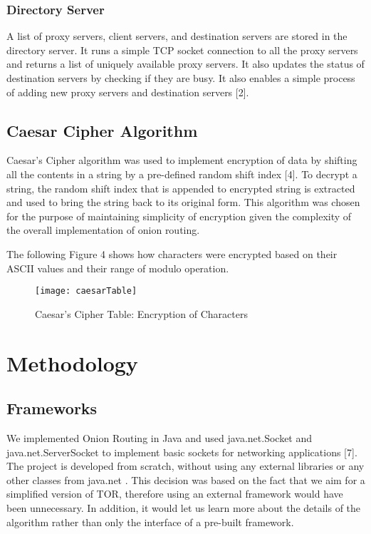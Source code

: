 \documentclass{article}
\begin{document}
\vspace{0.3 cm}

\subsubsection{Directory Server}
A list of proxy servers, client servers, and destination servers are stored in the directory server. It runs a simple TCP socket connection to all the proxy servers and returns a list of uniquely available proxy servers. It also updates the status of  destination servers by checking if they are busy. It also enables a simple process of adding new proxy servers and destination servers [2].

\vspace{0.3 cm}

\subsection{Caesar Cipher Algorithm}
Caesar's Cipher algorithm was used to implement encryption of data by shifting all the contents in a string by a pre-defined random shift index [4]. To decrypt a string, the random shift index that is appended to encrypted string is extracted and used to bring the string back to its original form. This algorithm was chosen for the purpose of maintaining simplicity of encryption given the complexity of the overall implementation of onion routing. \\

\vspace{0.3 cm}

The following Figure 4 shows how characters were encrypted based on their ASCII values and their range of modulo operation. \\

\begin{figure}[!ht]
	\label{fig:iv}
    \centering
    \texttt{[image: caesarTable]}
    \caption{Caesar's Cipher Table: Encryption of Characters}
\end{figure}

\section{Methodology}
\subsection{Frameworks}
We implemented Onion Routing in Java and used java.net.Socket and java.net.ServerSocket to implement basic sockets for networking applications [7]. The project is developed from scratch, without using any external libraries or any other classes from java.net . This decision was based on the fact that we aim for a simplified version of TOR, therefore using an external framework would have been unnecessary. In addition, it would let us learn more about the details of the algorithm rather than only the interface of a pre-built framework. \\
\end{document}
